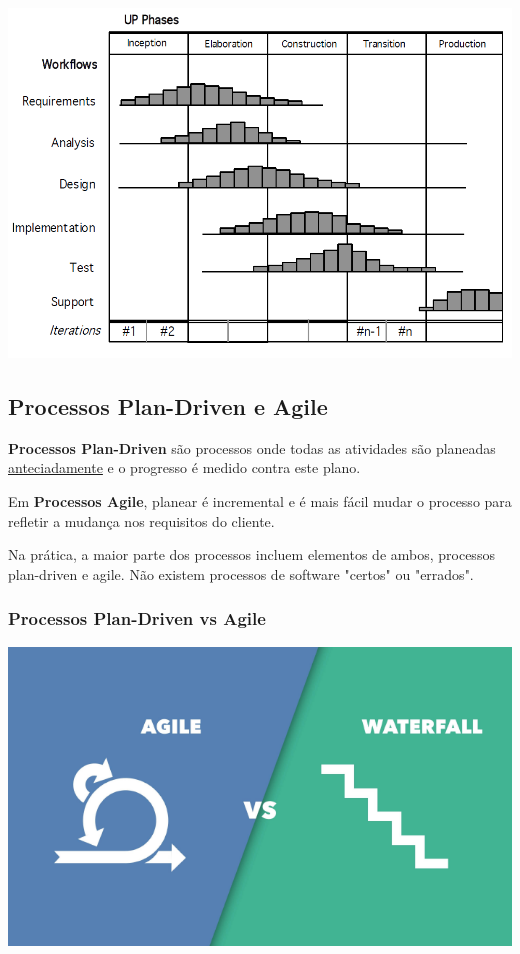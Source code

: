 \documentclass{article}
\begin{document}
\begin{center}
  \includegraphics[scale=0.4]{17}
\end{center}

\pagebreak

\subsection{Processos Plan-Driven e Agile}

\textbf{Processos Plan-Driven} são processos onde todas as atividades
são planeadas \uline{anteciadamente} e o progresso é medido
contra este plano.

\vspace{2mm}

Em \textbf{Processos Agile}, planear é incremental e é mais fácil
mudar o processo para refletir a mudança nos requisitos do cliente.

\vspace{2mm}

Na prática, a maior parte dos processos incluem elementos de ambos,
processos plan-driven e agile. Não existem processos de software
"certos" ou "errados".

\subsubsection{Processos Plan-Driven vs Agile}

\begin{center}
  \includegraphics[scale=0.5]{18}
\end{center}
\end{document}

